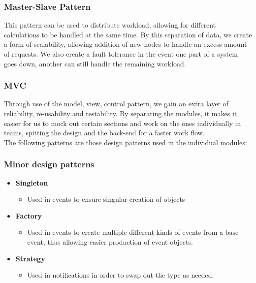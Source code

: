 \documentclass{article}
\begin{document}
			\subsubsection{Master-Slave Pattern}
		
			This pattern can be used to distribute workload, allowing for different calculations to be handled at the same time. By this separation of data, we create a form of scalability, allowing addition of new nodes to handle an excess amount of requests. We also create a fault tolerance in the event one part of a system goes down, another can still handle the remaining workload.
			
			\subsubsection{MVC}
			
			Through use of the model, view, control pattern, we gain an extra layer of reliability, re-usability and testability. By separating the modules, it makes it easier for us to mock out certain sections and work on the ones individually in teams, spitting the design and the back-end for a faster work flow. \\
			
			The following patterns are those design patterns used in the individual modules:
			
			\subsubsection{Minor design patterns}
				
				\begin{itemize}
					\item \textbf{Singleton}
						\begin{itemize}
							\item Used in events to ensure singular creation of objects
						\end{itemize}
					\item \textbf{Factory}
					\begin{itemize}
						\item Used in events to create multiple different kinds of events from a base event, thus allowing easier production of event objects.
					\end{itemize}
					\item \textbf{Strategy}
					\begin{itemize}
						\item Used in notifications in order to swap out the type as needed.
					\end{itemize}
				\end{itemize}
			
\end{document}
